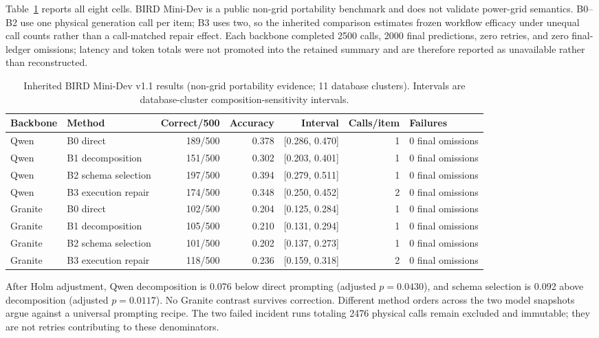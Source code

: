 \documentclass[applsci,article,submit,moreauthors]{Definitions/mdpi}
\begin{document}
Table~\ref{tab:bird} reports all eight cells. BIRD Mini-Dev is a public non-grid portability benchmark and does not validate power-grid semantics. B0--B2 use one physical generation call per item; B3 uses two, so the inherited comparison estimates frozen workflow efficacy under unequal call counts rather than a call-matched repair effect. Each backbone completed 2500 calls, 2000 final predictions, zero retries, and zero final-ledger omissions; latency and token totals were not promoted into the retained summary and are therefore reported as unavailable rather than reconstructed.

\begin{table}[htbp]
\caption{Inherited BIRD Mini-Dev v1.1 results (non-grid portability evidence; 11 database clusters). Intervals are database-cluster composition-sensitivity intervals.}
\label{tab:bird}
\centering
\small
\setlength{\tabcolsep}{3pt}
\begin{tabular}{llrrrrp{1.5cm}}
\toprule
Backbone & Method & Correct/500 & Accuracy & Interval & Calls/item & Failures\\
\midrule
Qwen & B0 direct & 189/500 & 0.378 & [0.286, 0.470] & 1 & 0 final omissions\\
Qwen & B1 decomposition & 151/500 & 0.302 & [0.203, 0.401] & 1 & 0 final omissions\\
Qwen & B2 schema selection & 197/500 & 0.394 & [0.279, 0.511] & 1 & 0 final omissions\\
Qwen & B3 execution repair & 174/500 & 0.348 & [0.250, 0.452] & 2 & 0 final omissions\\
Granite & B0 direct & 102/500 & 0.204 & [0.125, 0.284] & 1 & 0 final omissions\\
Granite & B1 decomposition & 105/500 & 0.210 & [0.131, 0.294] & 1 & 0 final omissions\\
Granite & B2 schema selection & 101/500 & 0.202 & [0.137, 0.273] & 1 & 0 final omissions\\
Granite & B3 execution repair & 118/500 & 0.236 & [0.159, 0.318] & 2 & 0 final omissions\\
\bottomrule
\end{tabular}
\end{table}

After Holm adjustment, Qwen decomposition is 0.076 below direct prompting (adjusted $p=0.0430$), and schema selection is 0.092 above decomposition (adjusted $p=0.0117$). No Granite contrast survives correction. Different method orders across the two model snapshots argue against a universal prompting recipe. The two failed incident runs totaling 2476 physical calls remain excluded and immutable; they are not retries contributing to these denominators.
\end{document}
